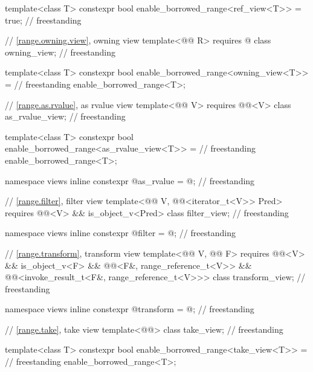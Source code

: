 \begin{codeblock}
{  template<class T>
    constexpr bool enable_borrowed_range<ref_view<T>> = true;                       // freestanding

  // \ref{range.owning.view}, owning view
  template<@@ R>
    requires @\seebelow@
  class owning_view;                                                                // freestanding

  template<class T>
    constexpr bool enable_borrowed_range<owning_view<T>> =                          // freestanding
      enable_borrowed_range<T>;

  // \ref{range.as.rvalue}, as rvalue view
  template<@@ V>
    requires @@<V>
  class as_rvalue_view;                                                             // freestanding

  template<class T>
    constexpr bool enable_borrowed_range<as_rvalue_view<T>> =                       // freestanding
      enable_borrowed_range<T>;

  namespace views { inline constexpr @\unspecnc@ as_rvalue = @\unspecnc@; }         // freestanding

  // \ref{range.filter}, filter view
  template<@@ V, @@<iterator_t<V>> Pred>
    requires @@<V> && is_object_v<Pred>
  class filter_view;                                                                // freestanding

  namespace views { inline constexpr @\unspecnc@ filter = @\unspecnc@; }            // freestanding

  // \ref{range.transform}, transform view
  template<@@ V, @@ F>
    requires @@<V> && is_object_v<F> &&
             @@<F&, range_reference_t<V>> &&
             @@<invoke_result_t<F&, range_reference_t<V>>>
  class transform_view;                                                             // freestanding

  namespace views { inline constexpr @\unspecnc@ transform = @\unspecnc@; }         // freestanding

  // \ref{range.take}, take view
  template<@@> class take_view;                                                   // freestanding

  template<class T>
    constexpr bool enable_borrowed_range<take_view<T>> =                            // freestanding
      enable_borrowed_range<T>;

}
\end{codeblock}
